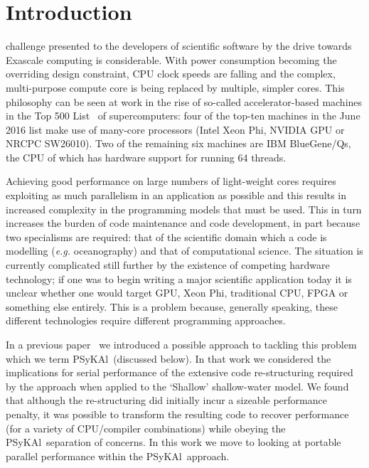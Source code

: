 \documentclass[journal]{IEEEtran}
\newcommand{\psykal}{{PS}y{KA}l}
\begin{document}
\section{Introduction}
% 
% 
% 
% 
 challenge presented to the developers of
scientific software by the drive towards Exascale computing is
considerable. With power consumption becoming the overriding design
constraint, CPU clock speeds are falling and the complex,
multi-purpose compute core is being replaced by multiple, simpler
cores. This philosophy can be seen at work in the rise of so-called
accelerator-based machines in the Top 500 List~\cite{top500} of
supercomputers: four of the top-ten machines in the June 2016 list
make use of many-core processors (Intel Xeon Phi, NVIDIA GPU or NRCPC
SW26010). Two of the remaining six machines are IBM BlueGene/Qs, the
CPU of which has hardware support for running 64 threads.

Achieving good performance on large numbers of light-weight cores
requires exploiting as much parallelism in an application as possible
and this results in increased complexity in the programming models
that must be used. This in turn increases the burden of code
maintenance and code development, in part because two specialisms are
required: that of the scientific domain which a code is modelling
({\it e.g.} oceanography) and that of computational science. The
situation is currently complicated still further by the existence of
competing hardware technology; if one was to begin writing a major
scientific application today it is unclear whether one would target
GPU, Xeon Phi, traditional CPU, FPGA or something else entirely. This
is a problem because, generally speaking, these different technologies
require different programming approaches.

In a previous paper~\cite{shallow_psykal} we introduced a possible
approach to tackling this problem which we term \psykal\ (discussed
below). In that work we considered the implications for serial
performance of the extensive code re-structuring required by the
approach when applied to the `Shallow' shallow-water model. We found
that although the re-structuring did initially incur a sizeable
performance penalty, it was possible to transform the resulting code
to recover performance (for a variety of CPU/compiler combinations)
while obeying the \psykal\ separation of concerns. In this work we
move to looking at portable parallel performance within the
\psykal\ approach.
\end{document}
